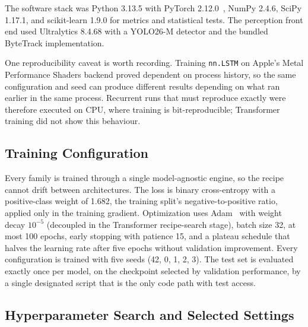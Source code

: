 \documentclass[mti,article,submit,moreauthors]{Definitions/mdpi}
\begin{document}
The software stack was Python 3.13.5 with PyTorch 2.12.0~\citep{paszke2019pytorch}, NumPy 2.4.6, SciPy 1.17.1, and scikit-learn 1.9.0 for metrics and statistical tests. The perception front end used Ultralytics 8.4.68 with a YOLO26-M detector and the bundled ByteTrack implementation.

One reproducibility caveat is worth recording. Training \texttt{nn.LSTM} on Apple's Metal Performance Shaders backend proved dependent on process history, so the same configuration and seed can produce different results depending on what ran earlier in the same process. Recurrent runs that must reproduce exactly were therefore executed on CPU, where training is bit-reproducible; Transformer training did not show this behaviour.

\subsection{Training Configuration}

Every family is trained through a single model-agnostic engine, so the recipe cannot drift between architectures. The loss is binary cross-entropy with a positive-class weight of 1.682, the training split's negative-to-positive ratio, applied only in the training gradient. Optimization uses Adam~\citep{kingma2015adam} with weight decay $10^{-5}$ (decoupled in the Transformer recipe-search stage), batch size 32, at most 100 epochs, early stopping with patience 15, and a plateau schedule that halves the learning rate after five epochs without validation improvement. Every configuration is trained with five seeds (42, 0, 1, 2, 3). The test set is evaluated exactly once per model, on the checkpoint selected by validation performance, by a single designated script that is the only code path with test access.

\subsection{Hyperparameter Search and Selected Settings}
\end{document}
